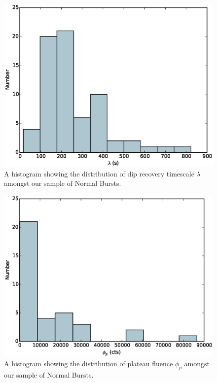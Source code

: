 \begin{figure}
  \centering
  \includegraphics[width=.9\linewidth, trim={0cm 0 0cm 0},clip]{images/appendix_lambda_hist.eps}
  \caption[Histogram showing the distribution of $\lambda$ amongst Normal Bursts.]{A histogram showing the distribution of dip recovery timescale $\lambda$ amongst our sample of Normal Bursts.}
  \label{fig:app_hist_lamb}
\end{figure}

\begin{figure}
  \centering
  \includegraphics[width=.9\linewidth, trim={0cm 0 0cm 0},clip]{images/appendix_plat_aafluence_hist.eps}
  \caption[Histogram showing the distribution of $\phi_p$ amongst Normal Bursts.]{A histogram showing the distribution of plateau fluence $\phi_p$ amongst our sample of Normal Bursts.}
  \label{fig:app_hist_phip}
\end{figure}


